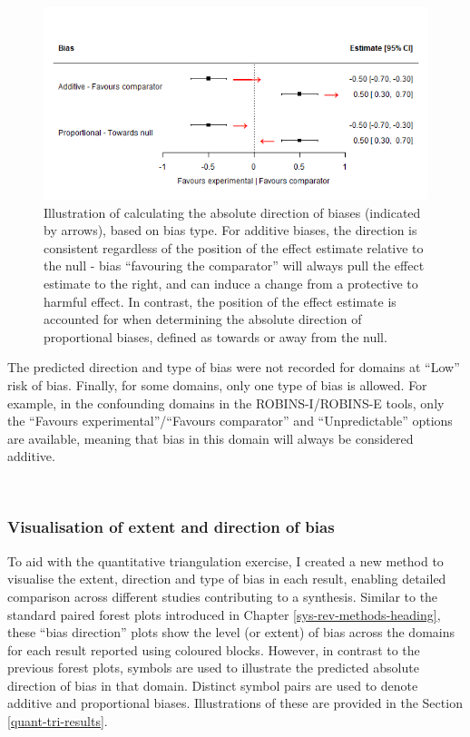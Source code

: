 \documentclass[a4paper, twoside]{templates/ociamthesis}
\begin{document}
\begin{figure}[H]
\includegraphics[width=1\linewidth]{figures/tri/exampleDirection} \caption[Illustration of calculating the absolute direction of biases, based on bias type.]{Illustration of calculating the absolute direction of biases (indicated by arrows), based on bias type. For additive biases, the direction is consistent regardless of the position of the effect estimate relative to the null - bias ``favouring the comparator'' will always pull the effect estimate to the right, and can induce a change from a protective to harmful effect. In contrast, the position of the effect estimate is accounted for when determining the absolute direction of proportional biases, defined as towards or away from the null.}\label{fig:exampleDirection}
\end{figure}

The predicted direction and type of bias were not recorded for domains at ``Low'' risk of bias. Finally, for some domains, only one type of bias is allowed. For example, in the confounding domains in the ROBINS-I/ROBINS-E tools, only the ``Favours experimental''/``Favours comparator'' and ``Unpredictable'' options are available, meaning that bias in this domain will always be considered additive.

~

\hypertarget{visualisation-of-extent-and-direction-of-bias}{%
\subsubsection{Visualisation of extent and direction of bias}\label{visualisation-of-extent-and-direction-of-bias}}

To aid with the quantitative triangulation exercise, I created a new method to visualise the extent, direction and type of bias in each result, enabling detailed comparison across different studies contributing to a synthesis. Similar to the standard paired forest plots introduced in Chapter \ref{sys-rev-methods-heading}, these ``bias direction'' plots show the level (or extent) of bias across the domains for each result reported using coloured blocks. However, in contrast to the previous forest plots, symbols are used to illustrate the predicted absolute direction of bias in that domain. Distinct symbol pairs are used to denote additive and proportional biases. Illustrations of these are provided in the Section \ref{quant-tri-results}.
\end{document}
